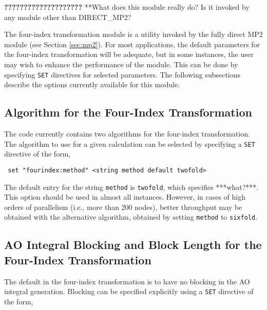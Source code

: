 \label{sec:fourindex}

{\bf ????????????????????}
\Large
**What does this module really do?  Is it invoked by any module other than
DIRECT\_MP2?
\normalsize


The four-index transformation module is a utility invoked by the fully
direct MP2 module (see Section \ref{sec:mp2}).  For most applications,
the default parameters for the four-index transformation will be adequate,
but in some instances, the user may wish to enhance the performance of
the module.  This can be done by specifying \verb+SET+ directives for
selected parameters.  The following subsections describe the options
currently available for this module.

\subsection{Algorithm for the Four-Index Transformation}

The code currently contains two algorithms for the four-index transformation.
The algorithm to use for a given calculation can be selected by specifying
a \verb+SET+ directive of the form,

\begin{verbatim}
 set "fourindex:method" <string method default twofold>
\end{verbatim}

The default entry for the string \verb+method+ is \verb+twofold+, which
specifies ***what?***.  This option should be used in almost all instances.
However, in cases of high orders of parallelism (i.e., more than 200 nodes),
 better throughput may be obtained with the alternative algorithm, 
obtained by setting \verb+method+ to \verb+sixfold+.

\subsection{AO Integral Blocking and Block Length for the Four-Index Transformation}

The default in the four-index transformation is to have no blocking in
the AO integral generation.  Blocking can be specified explicitly using a
\verb+SET+ directive of the form,

